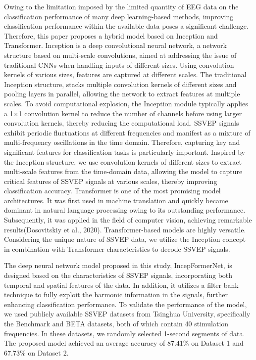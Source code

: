 \documentclass[10pt]{iopart}
\begin{document}
Owing to the limitation imposed by the limited quantity of EEG data on the classification performance of many deep learning-based methods, improving classification performance within the available data poses a significant challenge. Therefore, this paper proposes a hybrid model based on Inception and Transformer\cite{luo2022data}\cite{aznan2019simulating}\cite{bassi2021transfer}. Inception is a deep convolutional neural network, a network structure based on multi-scale convolutions\cite{Szegedy_Ioffe_Vanhoucke_Alemi_2017}, aimed at addressing the issue of traditional CNNs when handling inputs of different sizes. Using convolution kernels of various sizes, features are captured at different scales. The traditional Inception structure\cite{szegedy2015going}, stacks multiple convolution kernels of different sizes and pooling layers in parallel, allowing the network to extract features at multiple scales. To avoid computational explosion, the Inception module typically applies a 1×1 convolution kernel to reduce the number of channels before using larger convolution kernels, thereby reducing the computational load. SSVEP signals exhibit periodic fluctuations at different frequencies and manifest as a mixture of multi-frequency oscillations in the time domain. Therefore, capturing key and significant features for classification tasks is particularly important. Inspired by the Inception structure, we use convolution kernels of different sizes to extract multi-scale features from the time-domain data, allowing the model to capture critical features of SSVEP signals at various scales, thereby improving classification accuracy. Transformer is one of the most promising model architectures. It was first used in machine translation and quickly became dominant in natural language processing owing to its outstanding performance\cite{devlin2018bert}. Subsequently, it was applied in the field of computer vision, achieving remarkable results\cite{dosovitskiy2020image}(Dosovitskiy et al., 2020). Transformer-based models are highly versatile. Considering the unique nature of SSVEP data, we utilize the Inception concept in combination with Transformer characteristics to decode SSVEP signals.

The deep neural network model proposed in this study, IncepFormerNet, is designed based on the characteristics of SSVEP signals, incorporating both temporal and spatial features of the data. In addition, it utilizes a filter bank technique to fully exploit the harmonic information in the signals, further enhancing classification performance. To validate the performance of the model, we used publicly available SSVEP datasets from Tsinghua University, specifically the Benchmark and BETA datasets, both of which contain 40 stimulation frequencies. In these datasets, we randomly selected 1-second segments of data. The proposed model achieved an average accuracy of 87.41\% on Dataset 1 and 67.73\% on Dataset 2.
\end{document}
